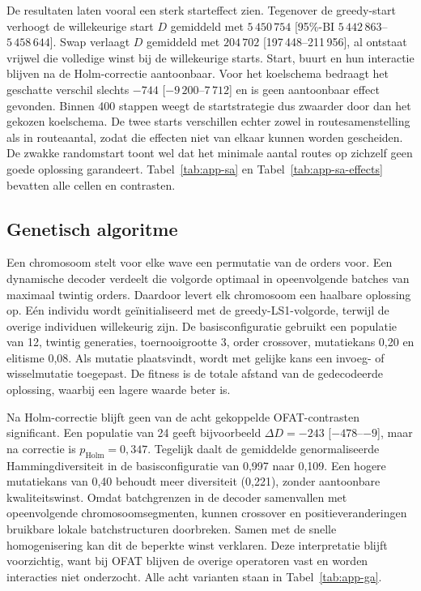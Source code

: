 \documentclass[a4paper,11pt]{article}
\newcommand{\dist}{\ensuremath{D}}
\begin{document}
De resultaten laten vooral een sterk starteffect zien. Tegenover de
greedy-start verhoogt de willekeurige start \dist{} gemiddeld met
$5\,450\,754$ [95\%-BI $5\,442\,863$--$5\,458\,644$]. Swap verlaagt \dist{}
gemiddeld met $204\,702$ [197\,448--211\,956], al ontstaat vrijwel die volledige
winst bij de willekeurige starts. Start, buurt en hun interactie blijven na de
Holm-correctie aantoonbaar. Voor het koelschema bedraagt het geschatte verschil
slechts $-744$ [$-9\,200$--$7\,712$] en is geen aantoonbaar effect gevonden.
Binnen 400 stappen weegt de startstrategie dus zwaarder door dan het gekozen
koelschema. De twee starts verschillen echter zowel in routesamenstelling als
in routeaantal, zodat die effecten niet van elkaar kunnen worden gescheiden. De
zwakke randomstart toont wel dat het minimale aantal routes op zichzelf geen
goede oplossing garandeert. Tabel~\ref{tab:app-sa} en
Tabel~\ref{tab:app-sa-effects} bevatten alle cellen en contrasten.

\subsection{Genetisch algoritme}
Een chromosoom stelt voor elke wave een permutatie van de orders voor. Een
dynamische decoder verdeelt die volgorde optimaal in opeenvolgende batches van
maximaal twintig orders. Daardoor levert elk chromosoom een haalbare oplossing
op. Eén individu wordt geïnitialiseerd met de greedy-LS1-volgorde, terwijl de
overige individuen willekeurig zijn. De basisconfiguratie gebruikt een populatie
van 12, twintig generaties, toernooigrootte 3, order crossover, mutatiekans 0,20
en elitisme 0,08. Als mutatie plaatsvindt, wordt met gelijke kans een invoeg- of
wisselmutatie toegepast. De fitness is de totale afstand van de gedecodeerde
oplossing, waarbij een lagere waarde beter is.

Na Holm-correctie blijft geen van de acht gekoppelde OFAT-contrasten
significant. Een populatie van 24 geeft bijvoorbeeld $\Delta D=-243$
[$-478$--$-9$], maar na correctie is $p_{\mathrm{Holm}}=0,347$. Tegelijk daalt
de gemiddelde genormaliseerde Hammingdiversiteit in de basisconfiguratie van
0,997 naar 0,109. Een hogere mutatiekans van 0,40 behoudt meer diversiteit
(0,221), zonder aantoonbare kwaliteitswinst. Omdat batchgrenzen in de decoder
samenvallen met opeenvolgende chromosoomsegmenten, kunnen crossover en
positieveranderingen bruikbare lokale batchstructuren doorbreken. Samen met de
snelle homogenisering kan dit de beperkte winst verklaren. Deze interpretatie
blijft voorzichtig, want bij OFAT blijven de overige operatoren vast en worden
interacties niet onderzocht. Alle acht varianten staan in Tabel~\ref{tab:app-ga}.
\end{document}
